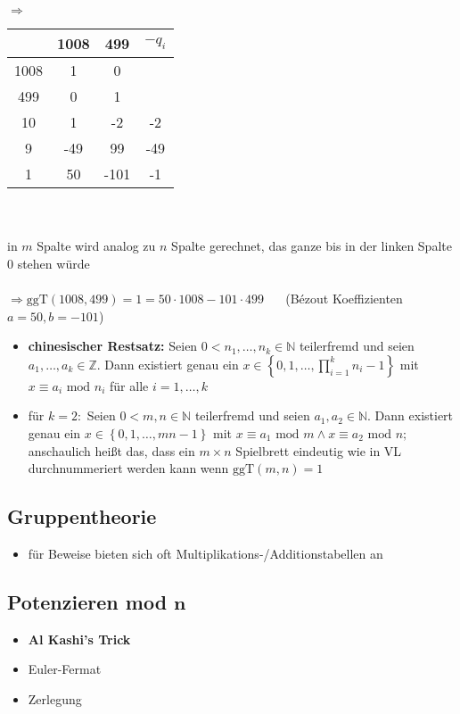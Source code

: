 \documentclass[10pt,a4paper]{article}
\begin{document}
\hspace{0.1cm} $\Rightarrow$\hspace{0.2cm}
\begin{tabular}{ c | c c | c }
   & 1008 & 499 & $-q_{i}$ \\ 
 \hline
 1008 & 1 & 0 & \\  
 499 & 0 & 1 &  \\  
 10 & 1 & -2 & -2\\
 9 & -49 & 99 & -49  \\
 1 & 50 & -101 & -1 \\
\end{tabular} \\\\
in $m$ Spalte wird analog zu $n$ Spalte gerechnet, das ganze bis in der linken Spalte 0 stehen würde \\\\
$\Rightarrow \text{ggT}(1008,499)=1=50\cdot 1008 -101\cdot 499\;\;\;\;\;$ (Bézout Koeffizienten $a=50, b=-101$)
\begin{itemize}
\item \textbf{chinesischer Restsatz:} Seien $0<n_{1},\dotsc ,n_{k}\in \mathbb{N}$ teilerfremd und seien $a_{1},\dotsc ,a_{k} \in \mathbb{Z}$. Dann existiert genau ein $x\in \left\lbrace 0,1,\dotsc,\prod_{i=1}^{k} n_{i}-1\right\rbrace$ mit $x\equiv a_{i} \text{ mod } n_{i}$ für alle $i=1,\dotsc, k$
\item für $k=2:$ Seien $0<m,n\in \mathbb{N}$ teilerfremd und seien $a_{1},a_{2} \in \mathbb{N}$. Dann existiert genau ein $x\in \left\lbrace 0,1,\dotsc,mn-1\right\rbrace$ mit $x\equiv a_{1} \text{ mod } m \land x\equiv a_{2} \text{ mod } n;\;$ anschaulich heißt das, dass ein $m\times n$ Spielbrett eindeutig wie in VL durchnummeriert werden kann wenn $\text{ggT}(m,n)=1$


\end{itemize}




\subsection{Gruppentheorie}
\begin{itemize}
\item für Beweise bieten sich oft Multiplikations-/Additionstabellen an
\end{itemize}



\subsection{Potenzieren mod $\boldsymbol{n}$}
\begin{itemize}
\item \textbf{Al Kashi's Trick}
\item Euler-Fermat
\item Zerlegung
\end{itemize}
\end{document}
